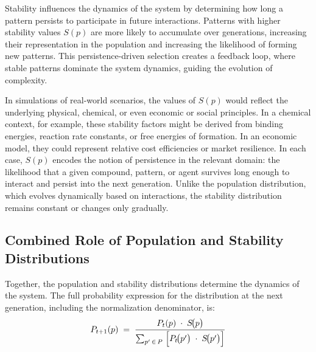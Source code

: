\documentclass[entropy,article,submit,pdftex,moreauthors]{Definitions/mdpi}
\begin{document}
Stability influences the dynamics of the system by determining how long a pattern persists to participate in future interactions. Patterns with higher stability values \( S(p) \) are more likely to accumulate over generations, increasing their representation in the population and increasing the likelihood of forming new patterns. This persistence-driven selection creates a feedback loop, where stable patterns dominate the system dynamics, guiding the evolution of complexity. 

In simulations of real-world scenarios, the values of \(S(p)\) would reflect the underlying physical, chemical, or even economic or social principles. In a chemical context, for example, these stability factors might be derived from binding energies, reaction rate constants, or free energies of formation. In an economic model, they could represent relative cost efficiencies or market resilience. In each case, \(S(p)\) encodes the notion of persistence in the relevant domain: the likelihood that a given compound, pattern, or agent survives long enough to interact and persist into the next generation. Unlike the population distribution, which evolves dynamically based on interactions, the stability distribution remains constant or changes only gradually. 

\subsection{Combined Role of Population and Stability Distributions}

Together, the population and stability distributions determine the dynamics of the system. The full probability expression for the distribution at the next generation, including the normalization denominator, is:
\begin{equation}
\label{eq:ba_update}
P_{t+1}(p)
\;=\;
\frac{\,P_{t}(p)\;\cdot\;S\!\bigl(p\bigr)\,}
     {\sum_{p'\,\in\,P}\;\Bigl[P_{t}\!\bigl(p'\bigr)\;\cdot\;S\!\bigl(p'\bigr)\Bigr]}
\end{equation}
\end{document}

